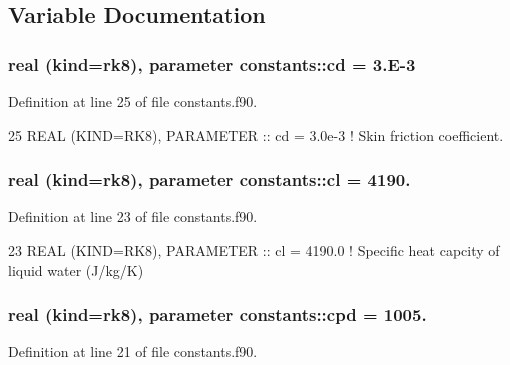 \subsection{Variable Documentation}
\subsubsection[{\texorpdfstring{cd}{cd}}]{\setlength{\rightskip}{0pt plus 5cm}real (kind=rk8), parameter constants\+::cd = 3.\+E-\/3}\hypertarget{namespaceconstants_a84ecaaf3771cbbfe65f7b15ef26bee36}{}\label{namespaceconstants_a84ecaaf3771cbbfe65f7b15ef26bee36}


Definition at line 25 of file constants.\+f90.


\begin{DoxyCode}
25 \textcolor{keywordtype}{REAL (KIND=RK8)}, \textcolor{keywordtype}{PARAMETER}  :: cd       = 3.0e-3            \textcolor{comment}{! Skin friction coefficient.}
\end{DoxyCode}
\subsubsection[{\texorpdfstring{cl}{cl}}]{\setlength{\rightskip}{0pt plus 5cm}real (kind=rk8), parameter constants\+::cl = 4190.}\hypertarget{namespaceconstants_a4f2911e99beba65b9371b9a80d7c08d0}{}\label{namespaceconstants_a4f2911e99beba65b9371b9a80d7c08d0}


Definition at line 23 of file constants.\+f90.


\begin{DoxyCode}
23 \textcolor{keywordtype}{REAL (KIND=RK8)}, \textcolor{keywordtype}{PARAMETER}  :: cl       = 4190.0            \textcolor{comment}{! Specific heat capcity of liquid water
       (J/kg/K)}
\end{DoxyCode}
\subsubsection[{\texorpdfstring{cpd}{cpd}}]{\setlength{\rightskip}{0pt plus 5cm}real (kind=rk8), parameter constants\+::cpd = 1005.}\hypertarget{namespaceconstants_a32354adf3493f59d0fc17b0302b2c368}{}\label{namespaceconstants_a32354adf3493f59d0fc17b0302b2c368}


Definition at line 21 of file constants.\+f90.


